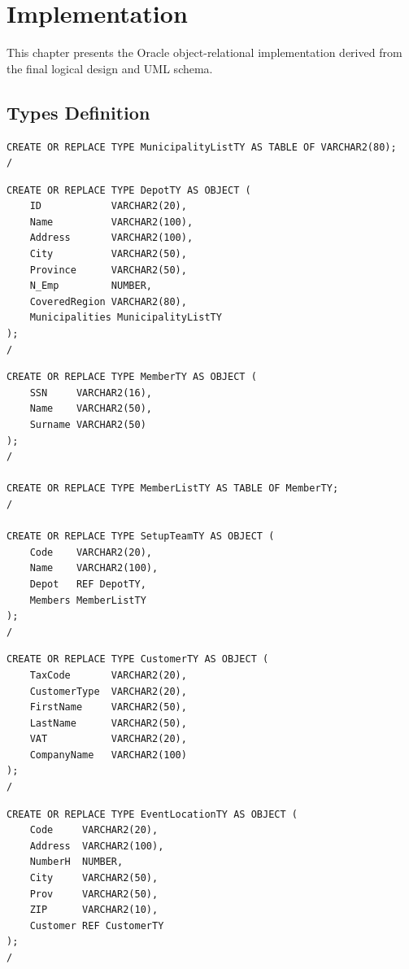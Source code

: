 \chapter{Implementation}

This chapter presents the Oracle object-relational implementation derived from the final logical design and UML schema.

\section{Types Definition}


\begin{lstlisting}
CREATE OR REPLACE TYPE MunicipalityListTY AS TABLE OF VARCHAR2(80);
/
\end{lstlisting}

\begin{lstlisting}
CREATE OR REPLACE TYPE DepotTY AS OBJECT (
    ID            VARCHAR2(20),
    Name          VARCHAR2(100),
    Address       VARCHAR2(100),
    City          VARCHAR2(50),
    Province      VARCHAR2(50),
    N_Emp         NUMBER,
    CoveredRegion VARCHAR2(80),
    Municipalities MunicipalityListTY
);
/
\end{lstlisting}

\begin{lstlisting}
CREATE OR REPLACE TYPE MemberTY AS OBJECT (
    SSN     VARCHAR2(16),
    Name    VARCHAR2(50),
    Surname VARCHAR2(50)
);
/

CREATE OR REPLACE TYPE MemberListTY AS TABLE OF MemberTY;
/

CREATE OR REPLACE TYPE SetupTeamTY AS OBJECT (
    Code    VARCHAR2(20),
    Name    VARCHAR2(100),
    Depot   REF DepotTY,
    Members MemberListTY
);
/
\end{lstlisting}

\begin{lstlisting}
CREATE OR REPLACE TYPE CustomerTY AS OBJECT (
    TaxCode       VARCHAR2(20),
    CustomerType  VARCHAR2(20),
    FirstName     VARCHAR2(50),
    LastName      VARCHAR2(50),
    VAT           VARCHAR2(20),
    CompanyName   VARCHAR2(100)
);
/
\end{lstlisting}

\begin{lstlisting}
CREATE OR REPLACE TYPE EventLocationTY AS OBJECT (
    Code     VARCHAR2(20),
    Address  VARCHAR2(100),
    NumberH  NUMBER,
    City     VARCHAR2(50),
    Prov     VARCHAR2(50),
    ZIP      VARCHAR2(10),
    Customer REF CustomerTY
);
/
\end{lstlisting}

